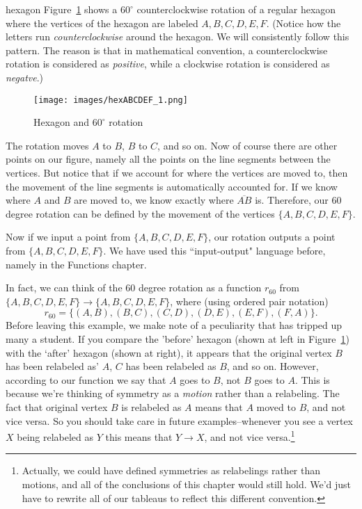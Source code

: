 \begin{example}{hexagon}
Figure~\ref{hex60rot}  shows a $60^\circ$ counterclockwise rotation of a regular hexagon where the vertices of the hexagon are labeled $A,B,C,D,E,F$. (Notice how the letters run \emph{counterclockwise} around the hexagon. We will consistently follow this pattern. The reason is that in mathematical convention, a counterclockwise rotation is considered as \emph{positive}, while a clockwise rotation is considered as \emph{negatve}.)


\begin{figure}[ht]
\begin{center}
\texttt{[image: images/hexABCDEF\_1.png]}
\caption{\label{hex60rot} Hexagon and  $60^\circ$ rotation}
\end{center}
\end{figure}



The rotation moves $A$ to $B$, $B$ to $C$, and so on.  Now of course there are other points on our figure, namely all the points on the line segments between the vertices.  But notice that if we account for where the vertices are moved to, then the movement of the line segments is automatically accounted for.  If we know where $A$ and $B$ are moved to, we know exactly where $\overline{AB}$ is.  Therefore, our $60$ degree rotation can be defined by the movement of the vertices  $\{A,B,C,D,E,F\}$.  

Now if we input a point from $\{A,B,C,D,E,F\}$, our rotation outputs a point from $\{A,B,C,D,E,F\}$.  We have used this ``input-output" language before, namely in the Functions chapter. 

In fact, we can think of the $60$ degree rotation as a function $r_{60}$ from $\{A,B,C,D,E,F\} \to \{A,B,C,D,E,F\}$, where (using ordered pair notation)
\[r_{60} = \{ (A,B), (B,C), (C,D), (D,E), (E,F), (F,A) \}.\]
Before leaving this example, we make note of a peculiarity that has tripped up many a student. If you compare the 'before' hexagon (shown at left in Figure~\ref{hex60rot}) with the `after' hexagon (shown at right), it appears that the original vertex $B$ has been relabeled as' $A$, $C$ has been relabeled as $B$, and so on.  However, according to our function we say that $A$ goes to $B$, not $B$ goes to $A$. This is because we're thinking of symmetry as a \emph{motion} rather than a relabeling. The fact that original vertex $B$ is relabeled as $A$ means that $A$ moved to $B$, and not vice versa. So you should take care in future examples--whenever you see a vertex $X$ being relabeled as $Y$ this means that $Y \rightarrow X$, and not vice versa.\footnote{Actually, we could have defined symmetries as relabelings rather than motions, and all of the conclusions of this chapter would still hold. We'd just have to rewrite all of our tableaus to reflect this different convention.}

 

\end{example}

